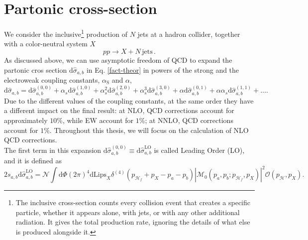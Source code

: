 \documentclass[a4paper, 12pt]{book}
\begin{document}
\section{Partonic cross-section}
We consider the inclusive\footnote{The inclusive cross-section counts every collision event that creates a specific particle, whether it appears alone, with jets, or with any other additional radiation. It gives the total production rate, ignoring the details of what else is produced alongside it.} production of $N$ jets at a hadron collider, together with a color-neutral system $X$
\begin{equation}
    pp \rightarrow X + N \, \mathrm{jets}  \, .
\end{equation}
As discussed above, we can use asymptotic freedom of QCD to expand the partonic cros section $\mathrm{d}\hat{\sigma}_{a,b}$ in Eq. \ref{fact-theor} in powers of the strong and the electroweak coupling constants, $\alpha_{\text{S}}$ and $\alpha$,
\begin{equation}
    \text{d} \hat{\sigma}_{a,b} = \text{d} \hat{\sigma}_{a,b}^{(0,0)} + \alpha_s \text{d} \hat{\sigma}_{a,b}^{(1,0)} + \alpha_s^2 \text{d} \hat{\sigma}_{a,b}^{(2,0)} + \alpha_s^3 \text{d} \hat{\sigma}_{a,b}^{(3,0)} + \alpha \text{d} \hat{\sigma}_{a,b}^{(0,1)} + \alpha \alpha_s \text{d} \hat{\sigma}_{a,b}^{(1,1)} + \dots .
\end{equation}
Due to the different values of the coupling constants, at the same order they have a different impact on the final result: at NLO, QCD corrections account for approximately $10\%$, while EW account for $1\%$; at NNLO, QCD corrections account for $1\%$. Throughout this thesis, we will focus on the calculation of NLO QCD corrections. \\
The first term in this expansion $\text{d} \hat{\sigma}_{a,b}^{(0,0)} \equiv \text{d} \hat{\sigma}_{a,b}^{\text{LO}}$ is called Leading Order (LO), and it is defined as \cite{Devoto:2025jql}
\begin{equation}
    2s_{a,b}\text{d} \hat{\sigma}_{a,b}^{\text{LO}} = \mathcal{N} \int \mathrm{d}\Phi (2\pi)^4 \mathrm{dLips}_X \delta^{(4)}(p_{\mathcal{H}_f}+p_X-p_a-p_b) \left|\mathcal{M}_0(p_a,p_b;p_{\mathcal{H}_f},p_X) \right|^2 \mathcal{O}(p_\mathcal{H},p_X).
    \label{leading-order}
\end{equation}
\end{document}
